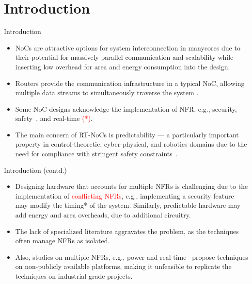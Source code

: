 \section{Introduction}

\begin{frame}{Introduction}
    \begin{itemize}
        \item NoCs are attractive options for system interconnection in
        manycores due to their potential for massively parallel communication and scalability while inserting low overhead for area and energy consumption into the design. 
        
        \item Routers provide the communication infrastructure in a typical NoC, allowing multiple data streams to simultaneously traverse the system  \cite{kumar:2021, benini:2002, jantsch:2005}. 
        
        \item Some NoC designs acknowledge the implementation of NFR, e.g., security, safety~\cite{Charles:2020, Guo:2020}, and real-time \textcolor{red}{(*)}. 
        
        \item The main concern of RT-NoCs is predictability --- a particularly important property in control-theoretic, cyber-physical, and robotics domains due to the need for compliance with stringent safety constraints~\cite{autosar:2021, iso:asil:2020, spice:2021}.%
        
    \end{itemize}
\end{frame}

\begin{frame}{Introduction (contd.)}
	\begin{itemize}
		\item Designing hardware that accounts for multiple NFRs is challenging due to the implementation of \textcolor{red}{conflicting NFRs}, e.g., implementing a security feature may modify the timing* of the system. Similarly, predictable hardware may add energy and area overheads, due to additional circuitry.
		
		\item The lack of specialized literature aggravates the problem, as the  techniques often manage NFRs as isolated. 
		
		\item Also, studies on multiple NFRs, e.g., power and real-time~\cite{li:2023} propose techniques on non-publicly available platforms, making it unfeasible to replicate the techniques on industrial-grade projects.
		
	\end{itemize}
\end{frame}

